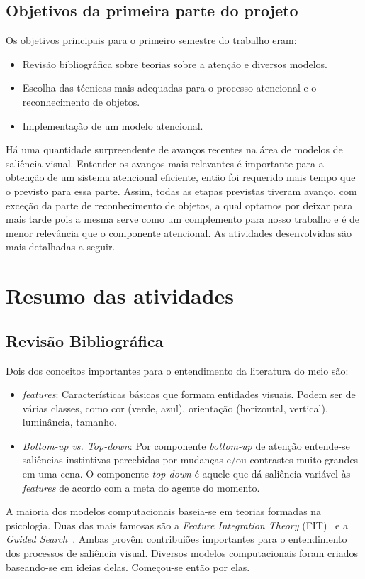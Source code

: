 \documentclass[article]{IEEEtran}
\newcommand{\tit}[1]{\textit{#1}}
\begin{document}
\subsection{Objetivos da primeira parte do projeto}
Os objetivos principais para o primeiro semestre do trabalho eram:
\begin{itemize}
    \item Revisão bibliográfica sobre teorias sobre a atenção e diversos
        modelos.
    \item Escolha das técnicas mais adequadas para o processo atencional
        e o reconhecimento de objetos.
    \item Implementação de um modelo atencional.
\end{itemize}
Há uma quantidade surpreendente de avanços recentes na área de modelos
de saliência visual.
Entender os avanços mais relevantes é importante para a obtenção de um sistema
atencional eficiente, então foi requerido mais tempo que o previsto para
essa parte.
Assim, todas as etapas previstas tiveram avanço, com exceção da parte de
reconhecimento de objetos, a qual optamos por deixar para mais tarde pois
a mesma serve como um complemento para nosso trabalho e é de menor relevância
que o componente atencional.
As atividades desenvolvidas são mais detalhadas a seguir.

\section{Resumo das atividades}
\subsection{Revisão Bibliográfica}
Dois dos conceitos importantes para o entendimento da literatura do meio são:
\begin{itemize}
    \item \tit{features}: Características básicas que formam entidades
        visuais. Podem ser de várias classes, como cor
        (verde, azul), orientação (horizontal, vertical), luminância, tamanho.
    \item \tit{Bottom-up vs. Top-down}: Por componente \tit{bottom-up} de
        atenção entende-se saliências instintivas percebidas por mudanças
        e/ou contrastes muito grandes em uma cena. O componente \tit{top-down}
        é aquele que dá saliência variável às \tit{features} de acordo
        com a meta do agente do momento.
\end{itemize}
A maioria dos modelos computacionais baseia-se em teorias formadas na
psicologia.
Duas das mais famosas são a \tit{Feature Integration Theory}
(FIT)~\cite{TreismanGelade1980} e a
\tit{Guided Search}~\cite{Wolfe1989}.
Ambas provêm contribuiões importantes para o entendimento dos processos
de saliência visual.
Diversos modelos computacionais foram criados baseando-se em ideias delas.
Começou-se então por elas.
\end{document}
